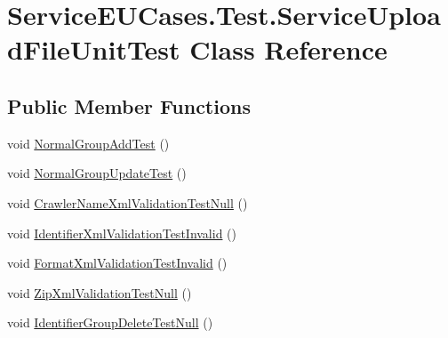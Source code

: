 \hypertarget{class_service_e_u_cases_1_1_test_1_1_service_upload_file_unit_test}{\section{Service\-E\-U\-Cases.\-Test.\-Service\-Upload\-File\-Unit\-Test Class Reference}
\label{class_service_e_u_cases_1_1_test_1_1_service_upload_file_unit_test}
}
\subsection*{Public Member Functions}
\begin{DoxyCompactItemize}
\item 
void \hyperlink{class_service_e_u_cases_1_1_test_1_1_service_upload_file_unit_test_a6655e0427071c85c9d00e5a6e3157cbd}{Normal\-Group\-Add\-Test} ()
\item 
void \hyperlink{class_service_e_u_cases_1_1_test_1_1_service_upload_file_unit_test_a555267d735a560f16a6ed308685957fd}{Normal\-Group\-Update\-Test} ()
\item 
void \hyperlink{class_service_e_u_cases_1_1_test_1_1_service_upload_file_unit_test_ac41316fb821d0ea7c2f7be39365e8cfc}{Crawler\-Name\-Xml\-Validation\-Test\-Null} ()
\item 
void \hyperlink{class_service_e_u_cases_1_1_test_1_1_service_upload_file_unit_test_a8e234edb970bc14da591c651c9adf31d}{Identifier\-Xml\-Validation\-Test\-Invalid} ()
\item 
void \hyperlink{class_service_e_u_cases_1_1_test_1_1_service_upload_file_unit_test_afac90702f7d426fece6dcce6985a1b1d}{Format\-Xml\-Validation\-Test\-Invalid} ()
\item 
void \hyperlink{class_service_e_u_cases_1_1_test_1_1_service_upload_file_unit_test_a4988d534de111594a66aef17de935f74}{Zip\-Xml\-Validation\-Test\-Null} ()
\item 
void \hyperlink{class_service_e_u_cases_1_1_test_1_1_service_upload_file_unit_test_a1f98a4b8de870b4fe0d29fd9d57d6844}{Identifier\-Group\-Delete\-Test\-Null} ()
\end{DoxyCompactItemize}


